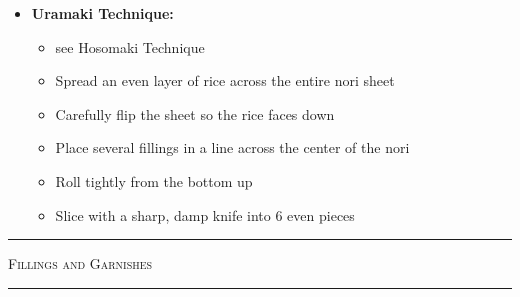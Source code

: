 \documentclass[landscape, a4paper]{article}
\newcommand\alert[1]{\textcolor{PrimaryColor}{\textbf{#1}}}
\begin{document}
\begin{minipage}[t]{0.31\textwidth}
\begin{itemize}
\begin{itemize}
			\item See Hosomaki Technique
			\item Full nori sheet without cutting
			\item Spread a thicker rice layer over the sheet, leaving about 1–2 cm uncovered at the top edge for sealing
			\item Arrange several fillings in a line across the rice about 2–3 cm from the bottom edge
			\item Roll tightly from the bottom up
			\item Slice with a sharp, damp knife into 6 even pieces
		\end{itemize}
		\item \alert{Uramaki Technique:}
		\begin{itemize}
			\item see Hosomaki Technique
			\item Spread an even layer of rice across the entire nori sheet
			\item Carefully flip the sheet so the rice faces down
			\item Place several fillings in a line across the center of the nori
			\item Roll tightly from the bottom up
			\item Slice with a sharp, damp knife into 6 even pieces
		\end{itemize}
	\end{itemize}

	\textcolor{WasabiText}{
		\rule{\linewidth}{0.5mm}
		\vspace{-0.1cm}
		\begin{center}
			\large
			\textsc{Fillings and Garnishes}
		\end{center}
		\rule{\linewidth}{0.5mm}
	}


\end{minipage}
\end{document}
